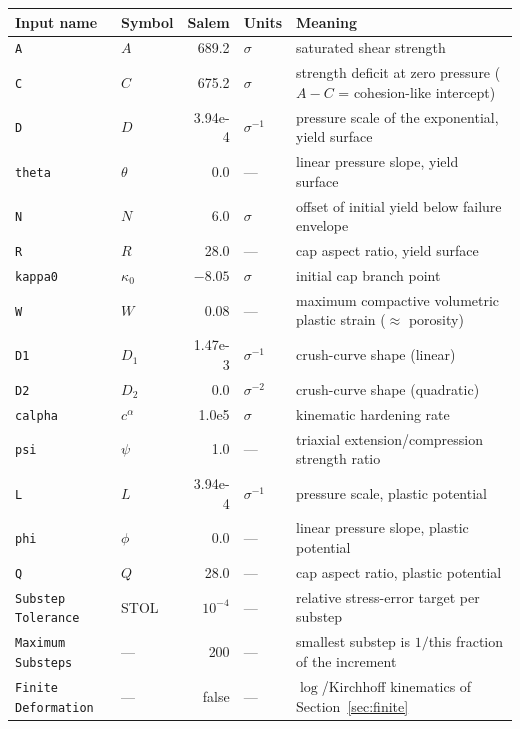 \documentclass[12pt]{article}
\begin{document}
\begin{center}
\small
\begin{tabular}{llrlp{5.4cm}}
\toprule
Input name & Symbol & Salem & Units & Meaning \\
\midrule
\texttt{A}       & $A$        & 689.2    & $\sigma$      & saturated shear strength \\
\texttt{C}       & $C$        & 675.2    & $\sigma$      & strength deficit at zero pressure ($A{-}C$ = cohesion-like intercept) \\
\texttt{D}       & $D$        & 3.94e-4  & $\sigma^{-1}$ & pressure scale of the exponential, yield surface \\
\texttt{theta}   & $\theta$   & 0.0      & ---           & linear pressure slope, yield surface \\
\texttt{N}       & $N$        & 6.0      & $\sigma$      & offset of initial yield below failure envelope \\
\texttt{R}       & $R$        & 28.0     & ---           & cap aspect ratio, yield surface \\
\texttt{kappa0}  & $\kappa_0$ & $-8.05$  & $\sigma$      & initial cap branch point \\
\texttt{W}       & $W$        & 0.08     & ---           & maximum compactive volumetric plastic strain ($\approx$ porosity) \\
\texttt{D1}      & $D_1$      & 1.47e-3  & $\sigma^{-1}$ & crush-curve shape (linear) \\
\texttt{D2}      & $D_2$      & 0.0      & $\sigma^{-2}$ & crush-curve shape (quadratic) \\
\texttt{calpha}  & $c^\alpha$ & 1.0e5    & $\sigma$      & kinematic hardening rate \\
\texttt{psi}     & $\psi$     & 1.0      & ---           & triaxial extension/compression strength ratio \\
\texttt{L}       & $L$        & 3.94e-4  & $\sigma^{-1}$ & pressure scale, plastic potential \\
\texttt{phi}     & $\phi$     & 0.0      & ---           & linear pressure slope, plastic potential \\
\texttt{Q}       & $Q$        & 28.0     & ---           & cap aspect ratio, plastic potential \\
\midrule
\texttt{Substep Tolerance} & STOL & $10^{-4}$ & --- &
  relative stress-error target per substep \\
\texttt{Maximum Substeps}  & ---  & 200 & --- &
  smallest substep is $1/$this fraction of the increment \\
\texttt{Finite Deformation} & --- & false & --- &
  $\log$/Kirchhoff kinematics of Section~\ref{sec:finite} \\
\bottomrule
\end{tabular}
\end{center}
\end{document}
